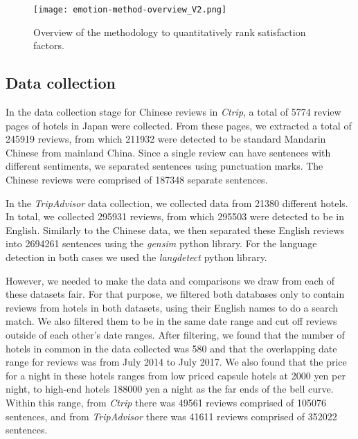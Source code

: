 \documentclass[smallextended,natbib]{svjour3}       %
\begin{document}
  \begin{figure}[bp]
  \centering
  \texttt{[image: emotion-method-overview\_V2.png]}
  \caption{Overview of the methodology to quantitatively rank satisfaction factors.}
  \label{fig:method-overview}
  \end{figure}

  \subsection{Data collection}\label{datacollection}

    In the data collection stage for Chinese reviews in \textit{Ctrip}, a total of \num[group-separator={,}]{5774} review pages of hotels in Japan were collected. From these pages, we extracted a total of \num[group-separator={,}]{245919} reviews, from which \num[group-separator={,}]{211932} were detected to be standard Mandarin Chinese from mainland China. Since a single review can have sentences with different sentiments, we separated sentences using punctuation marks. The Chinese reviews were comprised of \num[group-separator={,}]{187348} separate sentences. 

    In the \textit{TripAdvisor} data collection, we collected data from \num[group-separator={,}]{21380} different hotels. In total, we collected \num[group-separator={,}]{295931} reviews, from which \num[group-separator={,}]{295503} were detected to be in English. Similarly to the Chinese data, we then separated these English reviews into \num[group-separator={,}]{2694261} sentences using the \textit{gensim} python library. For the language detection in both cases we used the \textit{langdetect} python library.

    However, we needed to make the data and comparisons we draw from each of these datasets fair. For that purpose, we filtered both databases only to contain reviews from hotels in both datasets, using their English names to do a search match. We also filtered them to be in the same date range and cut off reviews outside of each other's date ranges. After filtering, we found that the number of hotels in common in the data collected was \num[group-separator={,}]{580} and that the overlapping date range for reviews was from July 2014 to July 2017. We also found that the price for a night in these hotels ranges from low priced capsule hotels at 2000 yen per night, to high-end hotels \num[group-separator={,}]{188000} yen a night as the far ends of the bell curve. Within this range, from \textit{Ctrip} there was \num[group-separator={,}]{49561} reviews comprised of \num[group-separator={,}]{105076} sentences, and from \textit{TripAdvisor} there was \num[group-separator={,}]{41611} reviews comprised of \num[group-separator={,}]{352022} sentences.
\end{document}
